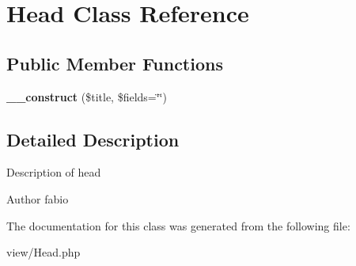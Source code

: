 \hypertarget{classHead}{\section{Head Class Reference}
\label{classHead}
}
\subsection*{Public Member Functions}
\begin{DoxyCompactItemize}
\item 
\hypertarget{classHead_a27eca7d61c333ac734cfc1d65b928b03}{{\bfseries \+\_\+\+\_\+construct} (\$title, \$fields=\char`\"{}\char`\"{})}\label{classHead_a27eca7d61c333ac734cfc1d65b928b03}

\end{DoxyCompactItemize}


\subsection{Detailed Description}
Description of head

\begin{DoxyAuthor}{Author}
fabio 
\end{DoxyAuthor}


The documentation for this class was generated from the following file\+:\begin{DoxyCompactItemize}
\item 
view/Head.\+php\end{DoxyCompactItemize}

